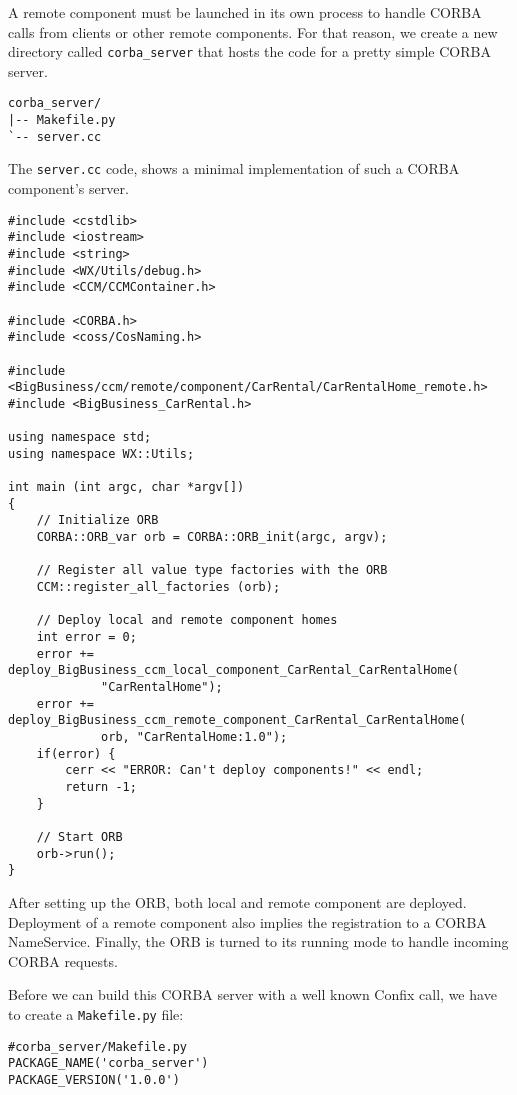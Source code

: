 A remote component must be launched in its own process to handle CORBA calls
from clients or other remote components.
For that reason, we create a new directory called {\tt corba\_server}
that hosts the code for a pretty simple CORBA server.
\begin{small}
\begin{verbatim}
corba_server/
|-- Makefile.py
`-- server.cc
\end{verbatim}
\end{small}

The {\tt server.cc} code, shows a minimal implementation of such a CORBA 
component's server.
\begin{small}
\begin{verbatim}
#include <cstdlib> 
#include <iostream>
#include <string>
#include <WX/Utils/debug.h>
#include <CCM/CCMContainer.h>

#include <CORBA.h>
#include <coss/CosNaming.h>

#include <BigBusiness/ccm/remote/component/CarRental/CarRentalHome_remote.h>
#include <BigBusiness_CarRental.h>

using namespace std;
using namespace WX::Utils;

int main (int argc, char *argv[])
{
    // Initialize ORB 
    CORBA::ORB_var orb = CORBA::ORB_init(argc, argv);

    // Register all value type factories with the ORB  
    CCM::register_all_factories (orb);

    // Deploy local and remote component homes	
    int error = 0;
    error += deploy_BigBusiness_ccm_local_component_CarRental_CarRentalHome(
             "CarRentalHome");
    error += deploy_BigBusiness_ccm_remote_component_CarRental_CarRentalHome(
             orb, "CarRentalHome:1.0");
    if(error) {
        cerr << "ERROR: Can't deploy components!" << endl;
        return -1;
    }

    // Start ORB
    orb->run();  
}
\end{verbatim}
\end{small}

After setting up the ORB, both local and remote component are deployed.
Deployment of a remote component also implies the registration to a 
CORBA NameService.
Finally, the ORB is turned to its running mode to handle incoming 
CORBA requests.


Before we can build this CORBA server with a well known Confix call, 
we have to create a {\tt Makefile.py} file:
\begin{small}
\begin{verbatim}
#corba_server/Makefile.py
PACKAGE_NAME('corba_server')
PACKAGE_VERSION('1.0.0')
\end{verbatim}
\end{small}

